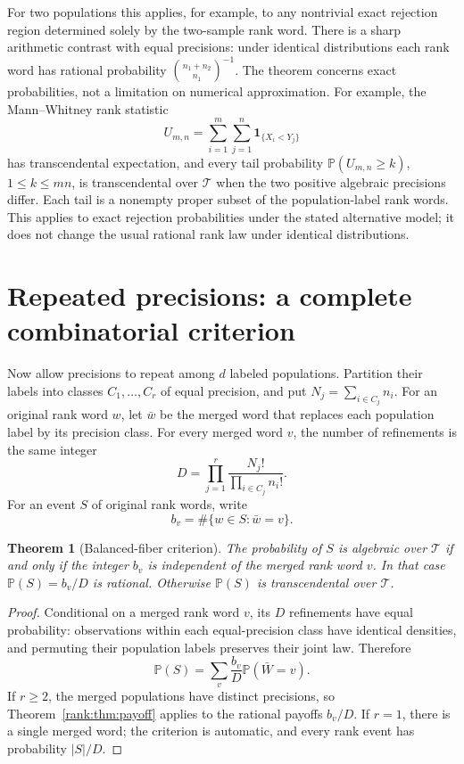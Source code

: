 \documentclass[11pt,a4paper]{article}
\newcommand{\T}{\mathcal T}
\newcommand{\PP}{\mathbb P}
\newtheorem{theorem}{Theorem}[section]
\theoremstyle{definition}
\theoremstyle{remark}
\numberwithin{equation}{section}
\begin{document}
For two populations this applies, for example, to any nontrivial exact
rejection region determined solely by the two-sample rank word.
There is a sharp arithmetic contrast with equal precisions: under
identical distributions each rank word has rational probability
$\binom{n_1+n_2}{n_1}^{-1}$. The theorem concerns exact probabilities,
not a limitation on numerical approximation.
For example, the Mann--Whitney rank statistic~\cite{MW}
\[
 U_{m,n}=\sum_{i=1}^{m}\sum_{j=1}^{n}\mathbf1_{\{X_i<Y_j\}}
\]
has transcendental expectation, and every tail probability
$\mathbb P(U_{m,n}\ge k)$, $1\le k\le mn$, is transcendental over
$\T$ when the two positive algebraic precisions differ.
Each tail is a nonempty proper subset of the population-label rank words.
This applies to exact rejection probabilities under the stated
alternative model; it does not change the usual rational rank law
under identical distributions.

\section{Repeated precisions: a complete combinatorial criterion}
Now allow precisions to repeat among $d$ labeled populations. Partition
their labels into classes $C_1,\ldots,C_r$ of equal precision, and put
$N_j=\sum_{i\in C_j}n_i$. For an original rank word $w$, let
$\bar w$ be the merged word that replaces each population label by
its precision class. For every merged word $v$, the number of
refinements is the same integer
\[
 D=\prod_{j=1}^r\frac{N_j!}{\prod_{i\in C_j}n_i!}.
\]
For an event $S$ of original rank words, write
\[
 b_v=\#\{w\in S:\bar w=v\}.
\]

\begin{theorem}[Balanced-fiber criterion]\label{rank:thm:fibers}
The probability of $S$ is algebraic over $\T$ if and only if the
integer $b_v$ is independent of the merged rank word $v$.
In that case $\PP(S)=b_v/D$ is rational. Otherwise $\PP(S)$ is
transcendental over $\T$.
\end{theorem}
\begin{proof}
Conditional on a merged rank word $v$, its $D$ refinements have
equal probability: observations within each equal-precision class
have identical densities, and permuting their population labels
preserves their joint law. Therefore
\[
 \PP(S)=\sum_v\frac{b_v}{D}\PP(\bar W=v).
\]
If $r\ge2$, the merged populations have distinct precisions, so
Theorem~\ref{rank:thm:payoff} applies to the rational payoffs $b_v/D$.
If $r=1$, there is a single merged word; the criterion is automatic,
and every rank event has probability $|S|/D$.
\end{proof}
\end{document}
